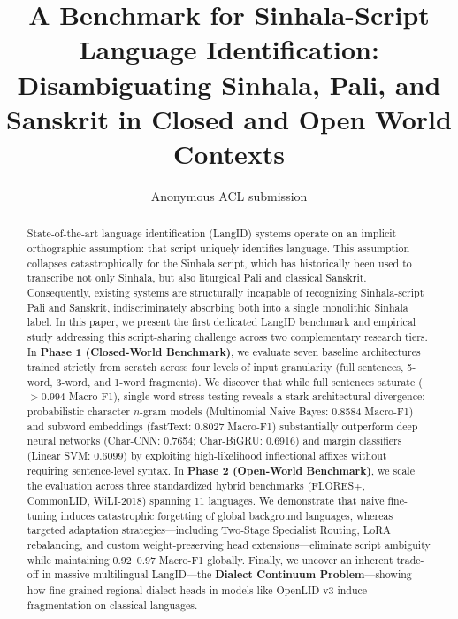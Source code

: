 \documentclass[11pt]{article}
\title{A Benchmark for Sinhala-Script Language Identification: \\ Disambiguating Sinhala, Pali, and Sanskrit in Closed and Open World Contexts}
\author{Anonymous ACL submission}
\begin{document}
\maketitle

\begin{abstract}
State-of-the-art language identification (LangID) systems operate on an implicit orthographic assumption: that script uniquely identifies language. This assumption collapses catastrophically for the Sinhala script, which has historically been used to transcribe not only Sinhala, but also liturgical Pali and classical Sanskrit. Consequently, existing systems are structurally incapable of recognizing Sinhala-script Pali and Sanskrit, indiscriminately absorbing both into a single monolithic Sinhala label. In this paper, we present the first dedicated LangID benchmark and empirical study addressing this script-sharing challenge across two complementary research tiers. In \textbf{Phase 1 (Closed-World Benchmark)}, we evaluate seven baseline architectures trained strictly from scratch across four levels of input granularity (full sentences, 5-word, 3-word, and 1-word fragments). We discover that while full sentences saturate ($>0.994$ Macro-F1), single-word stress testing reveals a stark architectural divergence: probabilistic character $n$-gram models (Multinomial Naive Bayes: 0.8584 Macro-F1) and subword embeddings (fastText: 0.8027 Macro-F1) substantially outperform deep neural networks (Char-CNN: 0.7654; Char-BiGRU: 0.6916) and margin classifiers (Linear SVM: 0.6099) by exploiting high-likelihood inflectional affixes without requiring sentence-level syntax. In \textbf{Phase 2 (Open-World Benchmark)}, we scale the evaluation across three standardized hybrid benchmarks (FLORES+, CommonLID, WiLI-2018) spanning 11 languages. We demonstrate that naive fine-tuning induces catastrophic forgetting of global background languages, whereas targeted adaptation strategies—including Two-Stage Specialist Routing, LoRA rebalancing, and custom weight-preserving head extensions—eliminate script ambiguity while maintaining $0.92$--$0.97$ Macro-F1 globally. Finally, we uncover an inherent trade-off in massive multilingual LangID—the \textbf{Dialect Continuum Problem}—showing how fine-grained regional dialect heads in models like OpenLID-v3 induce fragmentation on classical languages.
\end{abstract}
\end{document}
